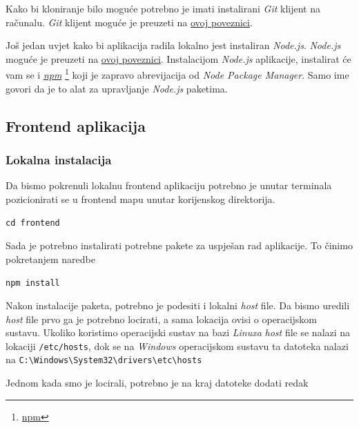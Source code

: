 		    Kako bi kloniranje bilo moguće potrebno je imati instalirani \textit{Git} klijent na računalu. \textit{Git} klijent moguće je preuzeti na \underline{\href{https://git-scm.com/downloads}{ovoj poveznici}}.
		    
		    Još jedan uvjet kako bi aplikacija radila lokalno jest instaliran \textit{Node.js}. \textit{Node.js} moguće je preuzeti na \underline{\href{https://nodejs.org/en/download/}{ovoj poveznici}}. Instalacijom \textit{Node.js} aplikacije, instalirat će vam se i \textit{\underline{npm}} \footnote{\href{https://www.npmjs.com/}{npm}} koji je zapravo abrevijacija od \textit{Node Package Manager}. Samo ime govori da je to alat za upravljanje \textit{Node.js} paketima.

		        
				\pagebreak
		

				\subsection{Frontend aplikacija}
	        
						\subsubsection*{Lokalna instalacija}
	        
	          		Da bismo pokrenuli lokalnu frontend aplikaciju potrebno je unutar terminala pozicionirati se u frontend mapu unutar korijenskog direktorija. 
	            
								\begin{center}
										\texttt{cd frontend}
								\end{center}
								
								Sada je potrebno instalirati potrebne pakete za uspješan rad aplikacije. To činimo pokretanjem naredbe
								
								\begin{center}
										\texttt{npm install}
								\end{center}
								
								Nakon instalacije paketa, potrebno je podesiti i lokalni \textit{host} file. Da bismo uredili \textit{host} file prvo ga je potrebno locirati, a sama lokacija ovisi o operacijskom sustavu. Ukoliko koristimo operacijski sustav na bazi \textit{Linuxa} \textit{host} file se nalazi na lokaciji \texttt{/etc/hosts}, dok se na \textit{Windows} operacijskom sustavu ta datoteka nalazi na \verb$C:\Windows\System32\drivers\etc\hosts$
								
								Jednom kada smo je locirali, potrebno je na kraj datoteke dodati redak

